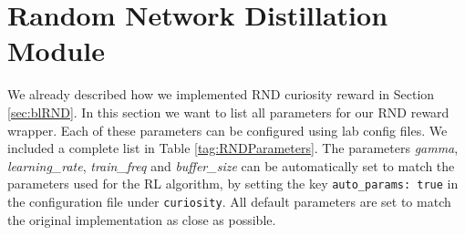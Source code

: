\section{Random Network Distillation Module}
We already described how we implemented RND curiosity reward in Section \ref{sec:blRND}. In this section we want to list all parameters for our RND reward wrapper. Each of these parameters can be configured using lab config files. We included a complete list in Table \ref{tag:RNDParameters}. The parameters \textit{gamma}, \textit{learning\_rate}, \textit{train\_freq} and \textit{buffer\_size} can be automatically set to match the parameters used for the RL algorithm, by setting the key \texttt{auto\_params: true} in the configuration file under \texttt{curiosity}. All default parameters are set to match the original implementation as close as possible.

